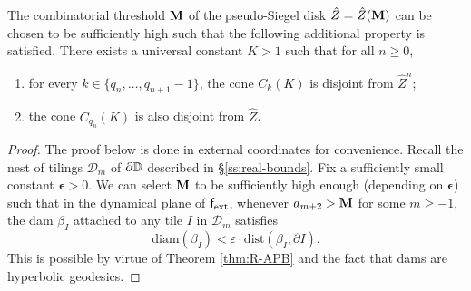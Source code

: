 \documentclass{amsart}
\begin{document}
\begin{lemma}
\label{lem:disjointness}
    The combinatorial threshold $\mathbf{M}$ of the pseudo-Siegel disk $\hat{Z} = \hat{Z}(\mathbf{M})$ can be chosen to be sufficiently high such that the following additional property is satisfied. 
    There exists a universal constant $K>1$ such that for all $n \geq 0$,
    \begin{enumerate}[label=\textnormal{(\arabic*)}]
        \item for every $k \in \{q_n,\ldots,q_{n+1}-1\}$, the cone $C_{k}(K)$ is disjoint from $\hat{Z}^n$;
        \item the cone $C_{q_n}(K)$ is also disjoint from $\hat{Z}$.
    \end{enumerate}
\end{lemma}

\begin{proof}
    The proof below is done in external coordinates for convenience.
    Recall the nest of tilings $\mathcal{D}_m$ of $\partial \mathbb{D}$ described in \S\ref{ss:real-bounds}.
    Fix a sufficiently small constant $\boldsymbol{\epsilon} > 0$. 
    We can select $\mathbf{M}$ to be sufficiently high enough (depending on $\boldsymbol{\epsilon}$) such that in the dynamical plane of $\mathsf{f}_{\textnormal{ext}}$, whenever $a_{m+2}>\mathbf{M}$ for some $m \geq -1$, the dam $\beta_I$ attached to any tile $I$ in $\mathcal{D}_m$ satisfies
    \[
        \text{diam}(\beta_I) < \varepsilon \cdot \text{dist}(\beta_I, \partial I).
    \]
    This is possible by virtue of Theorem \ref{thm:R-APB} and the fact that dams are hyperbolic geodesics.
    

\end{proof}
\end{document}
